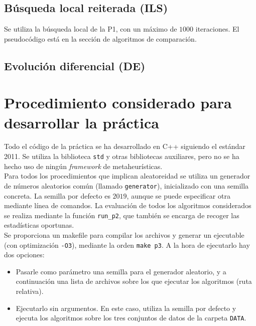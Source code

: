 \documentclass[12pt]{article}
\begin{document}
\subsection*{Búsqueda local reiterada (ILS)}
\label{bl}

Se utiliza la búsqueda local de la P1, con un máximo de $1000$ iteraciones. El pseudocódigo está en la sección de algoritmos de comparación.

\subsection*{Evolución diferencial (DE)}
\label{ed}

\newpage
\section{Procedimiento considerado para desarrollar la práctica}

Todo el código de la práctica se ha desarrollado en C++ siguiendo el estándar 2011. Se utiliza la biblioteca \verb|std| y otras bibliotecas auxiliares, pero no se ha hecho uso de ningún \textit{framework} de metaheurísticas.\\

Para todos los procedimientos que implican aleatoreidad se utiliza un generador de números aleatorios común (llamado \verb|generator|), inicializado con una semilla concreta. La semilla por defecto es $2019$, aunque se puede especificar otra mediante línea de comandos. La evaluación de todos los algoritmos considerados se realiza mediante la función \verb|run_p2|, que también se encarga de recoger las estadísticas oportunas.\\

Se proporciona un makefile para compilar los archivos y generar un ejecutable (con optimización \verb|-O3|), mediante la orden \verb|make p3|. A la hora de ejecutarlo hay dos opciones:

\begin{itemize}
    \item Pasarle como parámetro una semilla para el generador aleatorio, y a continuación una lista de archivos sobre los que ejecutar los algoritmos (ruta relativa).
    \item Ejecutarlo sin argumentos. En este caso, utiliza la semilla por defecto y ejecuta los algoritmos sobre los tres conjuntos de datos de la carpeta \verb|DATA|.
\end{itemize}
\end{document}
